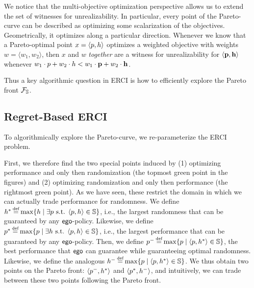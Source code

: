 \begin{remark}\label{rem:scalarwitnesses}
We notice that the multi-objective optimization perspective allows us to extend the set of witnesses for unrealizability. In particular, every point of the Pareto-curve can be described as optimizing some scalarization of the objectives. Geometrically, it optimizes along a particular direction. Whenever we know that a Pareto-optimal point $x = \langle p, h \rangle$ optimizes a weighted objective with weights $w = \langle w_1, w_2 \rangle$, then $x$ and $w$ \emph{together} are a witness for unrealizability for $\langle \mathbf{p}, \mathbf{h} \rangle$ whenever $w_1 \cdot p + w_2 \cdot h < w_1 \cdot \mathbf{p} + w_2 \cdot \mathbf{h}$. 
\end{remark}

Thus a key algorithmic question in ERCI is how to efficiently explore
 the Pareto front $\mathcal{F}_{\mathbb{S}}$. 
 
 \subsection{Regret-Based ERCI}
 To algorithmically explore the Pareto-curve, we re-parameterize the ERCI problem. 
 
 First, we therefore find  the two special points induced by (1) optimizing performance and only then randomization (the topmost green point in the figures) and (2) optimizing randomization and only then performance (the rightmost green point). 
As we have seen, these restrict the domain in which we can actually trade performance for randomness. 
We define 
$\rndopt \eqdef \max \{ \rndp \mid \exists \scp \text{ s.t. } \langle \scp, \rndp \rangle \in \solutions  \} $, i.e., the largest randomness that can be guaranteed by any $\mathsf{ego}$-policy. 
Likewise, we define 
$\scopt \eqdef \max \{ \scp \mid \exists \rndp \text{ s.t. } \langle \scp, \rndp \rangle \in \solutions  \} $, i.e., the largest performance that can be guaranteed by any $\mathsf{ego}$-policy. 
Then, we define 
$\scmin \eqdef \max \{ \scp \mid \langle \scp, \rndopt \rangle  \in \solutions \}$, the best performance that $\mathsf{ego}$ can guarantee while guaranteeing optimal randomness. 
Likewise, we define  the analogous $\rndmin \eqdef \max \{ \scp \mid \langle \scp, \rndopt \rangle  \in \solutions \}$.
We thus obtain two points on the Pareto front: $\langle p^{-}, h^{*} \rangle$ and $\langle p^{*}, h^{-} \rangle$, and intuitively, we can trade between these two points following the Pareto front.


